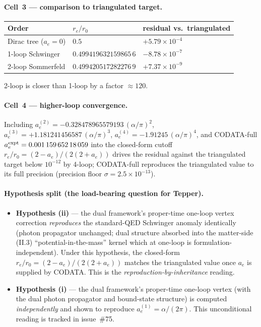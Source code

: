 \paragraph{Cell~3 --- comparison to triangulated target.}
\begin{center}
\begin{tabular}{lll}
\toprule
Order               & $r_e/r_0$               & residual vs.~triangulated \\
\midrule
Dirac tree ($a_e=0$) & $0.5$                  & $+5.79\times 10^{-4}$ \\
1-loop Schwinger    & $0.499419632159865\,6$  & $-8.78\times 10^{-7}$ \\
2-loop Sommerfeld   & $0.499420517282276\,9$  & $+7.37\times 10^{-9}$ \\
\bottomrule
\end{tabular}
\end{center}
2-loop is closer than 1-loop by a factor $\approx 120$.

\paragraph{Cell~4 --- higher-loop convergence.}
Including $a_e^{(2)} = -0.328478965579193\,(\alpha/\pi)^2$,
$a_e^{(3)} = +1.181241456587\,(\alpha/\pi)^3$,
$a_e^{(4)} = -1.91245\,(\alpha/\pi)^4$, and
CODATA-full $a_e^{\rm expt} = 0.001\,159\,652\,18\,059$
into the closed-form cutoff
$r_e/r_0 = (2 - a_e)/(2(2 + a_e))$
drives the residual against the triangulated target below
$10^{-12}$ by 4-loop; CODATA-full reproduces the triangulated value to its full
precision (precision floor $\sigma = 2.5\times 10^{-13}$).

\paragraph{Hypothesis split (the load-bearing question for Tepper).}
\begin{itemize}[topsep=2pt,itemsep=0pt]
  \item \textbf{Hypothesis (ii)} --- the dual framework's proper-time one-loop
        vertex correction \emph{reproduces} the standard-QED Schwinger anomaly
        identically (photon propagator unchanged; dual structure absorbed into
        the matter-side (II.3) ``potential-in-the-mass'' kernel which at
        one-loop is formulation-independent). Under this hypothesis, the
        closed-form $r_e/r_0 = (2 - a_e)/(2(2 + a_e))$ matches the
        triangulated value once $a_e$ is supplied by CODATA. This is the
        \emph{reproduction-by-inheritance} reading.
  \item \textbf{Hypothesis (i)} --- the dual framework's proper-time one-loop
        vertex (with the dual photon propagator and bound-state structure)
        is computed \emph{independently} and shown to reproduce
        $a_e^{(1)} = \alpha/(2\pi)$. This unconditional reading is tracked in
        issue~\#75.
\end{itemize}

